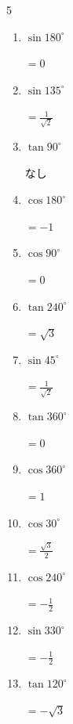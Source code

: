 \begin{multicols}{5}
\begin{enumerate}
  \item $\displaystyle \sin{180^\circ}$

        $\displaystyle =0$

  \item $\displaystyle \sin{135^\circ}$

        $\displaystyle =\frac{1}{\sqrt{2}}$

  \item $\displaystyle \tan{90^\circ}$

        $\displaystyle なし$

  \item $\displaystyle \cos{180^\circ}$

        $\displaystyle =-1$

  \item $\displaystyle \cos{90^\circ}$

        $\displaystyle =0$

  \item $\displaystyle \tan{240^\circ}$

        $\displaystyle =\sqrt{3}$

  \item $\displaystyle \sin{45^\circ}$

        $\displaystyle =\frac{1}{\sqrt{2}}$

\columnbreak %

\resetques

  \item $\displaystyle \tan{360^\circ}$

        $\displaystyle =0$

  \item $\displaystyle \cos{360^\circ}$

        $\displaystyle =1$

  \item $\displaystyle \cos{30^\circ}$

        $\displaystyle =\frac{\sqrt{3}}{2}$

  \item $\displaystyle \cos{240^\circ}$

        $\displaystyle =-\frac{1}{2}$

  \item $\displaystyle \sin{330^\circ}$

        $\displaystyle =-\frac{1}{2}$

  \item $\displaystyle \tan{120^\circ}$

        $\displaystyle =-\sqrt{3}$


\end{enumerate}
\end{multicols}
